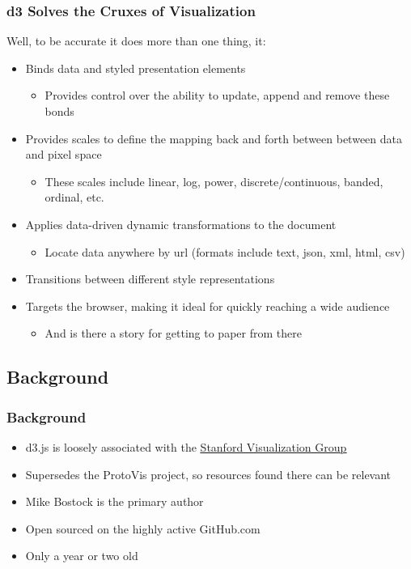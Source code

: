 \documentclass{beamer}
\begin{document}
\begin{frame}
\frametitle{d3 Solves the Cruxes of Visualization}
Well, to be accurate it does more than one thing, it:
\begin{itemize}
\item Binds data and styled presentation elements 
    \begin{itemize}
    \item Provides control over the ability to update, append and remove these bonds
    \end{itemize}
\item Provides scales to define the mapping back and forth between between data and pixel space
    \begin{itemize}
    \item These scales include linear, log, power, discrete/continuous, banded, ordinal, etc.
    \end{itemize}
\item Applies data-driven dynamic transformations to the document
    \begin{itemize}
    \item Locate data anywhere by url (formats include text, json, xml, html, csv)
    \end{itemize}
\item Transitions between different style representations
\item Targets the browser, making it ideal for quickly reaching a wide audience
    \begin{itemize}
    \item And is there a story for getting to paper from there
    \end{itemize}
\end{itemize}
\end{frame}



\subsection{Background}


\begin{frame}
\frametitle{Background}
\begin{itemize}
\item d3.js is loosely associated with the \href{http://vis.stanford.edu/}{\underline{Stanford Visualization Group}}
\item Supersedes the ProtoVis project, so resources found there can be relevant
\item Mike Bostock is the primary author
\item Open sourced on the highly active GitHub.com
\item Only a year or two old
\end{itemize}
\end{frame}
\end{document}
